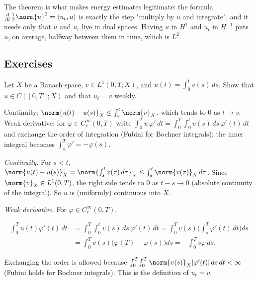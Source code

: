 The theorem is what makes energy estimates legitimate: the formula $\frac{d}{dt}\frac12\norm{u}^2 = \langle u_t, u\rangle$ is exactly the step "multiply by $u$ and integrate", and it needs only that $u$ and $u_t$ live in dual spaces. Having $u$ in $H^1$ and $u_t$ in $H^{-1}$ puts $u$, on average, halfway between them in time, which is $L^2$.

\subsection*{Exercises}

\begin{exercise}
  Let $X$ be a Banach space, $v \in L^1(0,T;X)$, and $u(t) = \int_0^t v(s)\,ds$. Show that $u \in C([0,T];X)$ and that $u_t = v$ weakly.
  \begin{hint}
    Continuity: $\norm{u(t) - u(s)}_X \le \int_s^t \norm{v}_X$, which tends to $0$ as $t \to s$. Weak derivative: for $\varphi \in C_c^\infty(0,T)$ write $\int_0^T u\,\varphi'\,dt = \int_0^T \int_0^t v(s)\,ds\,\varphi'(t)\,dt$ and exchange the order of integration (Fubini for Bochner integrals); the inner integral becomes $\int_s^T \varphi' = -\varphi(s)$.
  \end{hint}
  \begin{solution}
    \emph{Continuity.} For $s < t$, $\norm{u(t) - u(s)}_X = \norm{\int_s^t v(\tau)\,d\tau}_X \le \int_s^t \norm{v(\tau)}_X\,d\tau$. Since $\norm{v}_X \in L^1(0,T)$, the right side tends to $0$ as $t - s \to 0$ (absolute continuity of the integral). So $u$ is (uniformly) continuous into $X$.

    \emph{Weak derivative.} For $\varphi \in C_c^\infty(0,T)$,

    \[ \begin{aligned}
             \int_0^T u(t)\varphi'(t)\,dt &= \int_0^T\!\!\int_0^t v(s)\,ds\,\varphi'(t)\,dt = \int_0^T v(s)\Big(\int_s^T\varphi'(t)\,dt\Big)ds \\
             &= \int_0^T v(s)\big(\varphi(T) - \varphi(s)\big)ds = -\int_0^T v\varphi\,ds.
             \end{aligned} \]

    Exchanging the order is allowed because $\int_0^T\!\int_0^T \norm{v(s)}_X|\varphi'(t)|\,ds\,dt < \infty$ (Fubini holds for Bochner integrals). This is the definition of $u_t = v$.
  \end{solution}
\end{exercise}

